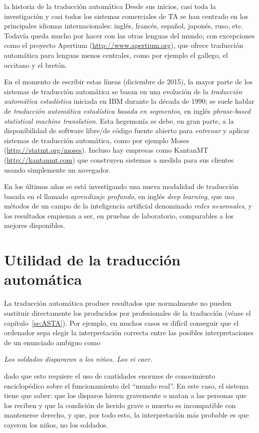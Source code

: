 \begin{persabermes}{la historia de la traducción automática}
Desde sus inicios, casi toda la investigación y casi todos los sistemas comerciales de TA se han centrado en los principales idiomas internacionales: inglés, francés, español, japonés, ruso, etc. Todavía queda mucho por hacer con las otras lenguas del mundo; con excepciones como el proyecto Apertium (\url{http://www.apertium.org}), que ofrece traducción automática para lenguas menos centrales, como por ejemplo el gallego, el occitano y el bretón. 

En el momento de escribir estas líneas (diciembre de 2015), la mayor parte de los sistemas de traducción automática se basan en una evolución de la \emph{traducción automática estadística} iniciada en IBM durante la década de 1990; se suele hablar de \emph{traducción automática estadística basada en segmentos}, en inglés \emph{phrase-based statistical machine translation}. Esta hegemonía se debe, en gran parte, a la disponibilidad de software libre/de código fuente abierto para \emph{entrenar} y aplicar sistemas de traducción automática, como por ejemplo Moses (\url{http://statmt.org/moses}). Incluso hay empresas como KantanMT (\url{http://kantanmt.com}) que construyen sistemas a medida para sus clientes usando simplemente un navegador. 

En los últimos años se está investigando una nueva modalidad de traducción basada en el llamado \emph{aprendizaje profundo}, en inglés \emph{deep learning}, que usa métodos de un campo de la inteligencia artificial denominado \emph{redes neuronales}, y los resultados empiezan a ser, en pruebas de laboratorio, comparables a los mejores disponibles. 

\end{persabermes} 

\section{Utilidad de la traducción automática} \label{ss:UTA} La traducción automática produce resultados que normalmente no pueden sustituir directamente los producidos por profesionales de la traducción (véase el capítulo~\ref{se:ASTA}). Por ejemplo, en muchos casos es difícil conseguir que el ordenador sepa elegir la interpretación correcta entre las posibles interpretaciones de un enunciado ambiguo como \begin{center} \emph{Los soldados dispararon a los niños. Los vi caer.} \end{center} dado que esto requiere el uso de cantidades enormes de conocimiento enciclopédico sobre el funcionamiento del ``mundo real''. En este caso, el sistema tiene que saber: que los disparos hieren gravemente o matan a las personas que los reciben y que la condición de herido grave o muerto es incompatible con mantenerse derecho, y que, por todo esto, la interpretación más probable es que cayeron los niños, no los soldados. 

